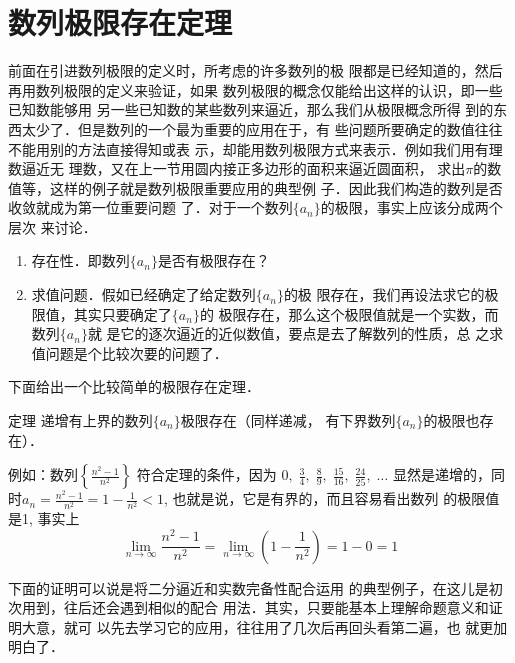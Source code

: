 \section{数列极限存在定理}
前面在引进数列极限的定义时，所考虑的许多数列的极
限都是已经知道的，然后再用数列极限的定义来验证，如果
数列极限的概念仅能给出这样的认识，即一些已知数能够用
另一些已知数的某些数列来逼近，那么我们从极限概念所得
到的东西太少了．但是数列的一个最为重要的应用在于，有
些问题所要确定的数值往往不能用别的方法直接得知或表
示，却能用数列极限方式来表示．例如我们用有理数逼近无
理数，又在上一节用圆内接正多边形的面积来逼近圆面积，
求出$\pi$的数值等，这样的例子就是数列极限重要应用的典型例
子．因此我们构造的数列是否收敛就成为第一位重要问题
了．对于一个数列$\{a_n\}$的极限，事实上应该分成两个层次
来讨论．

\begin{enumerate}
    \item 存在性．即数列$\{a_n\}$是否有极限存在？
    \item 求值问题．假如已经确定了给定数列$\{a_n\}$的极
限存在，我们再设法求它的极限值，其实只要确定了$\{a_n\}$的
极限存在，那么这个极限值就是一个实数，而数列$\{a_n\}$就
是它的逐次逼近的近似数值，要点是去了解数列的性质，总
之求值问题是个比较次要的问题了． 
\end{enumerate}

下面给出一个比较简单的极限存在定理．

\begin{blk}{定理}
    递增有上界的数列$\{a_n\}$极限存在（同样递减，
有下界数列$\{a_n\}$的极限也存在）．
\end{blk}
 
例如：数列$\left\{\frac{n^2-1}{n^2}\right\}$
符合定理的条件，因为
$0,\; \frac{3}{4},\; \frac{8}{9},\; \frac{15}{16},\; \frac{24}{25},\; \ldots$
显然是递增的，同时$a_n=\frac{n^2-1}{n^2}=1-\frac{1}{n^2}<1$, 也就是说，它是有界的，而且容易看出数列
的极限值是1, 事实上
\[\lim_{n\to\infty}\frac{n^2-1}{n^2}=\lim_{n\to\infty}\left(1-\frac{1}{n^2}\right)=1-0=1\]

下面的证明可以说是将二分逼近和实数完备性配合运用
的典型例子，在这儿是初次用到，往后还会遇到相似的配合
用法．其实，只要能基本上理解命题意义和证明大意，就可
以先去学习它的应用，往往用了几次后再回头看第二遍，也
就更加明白了．

